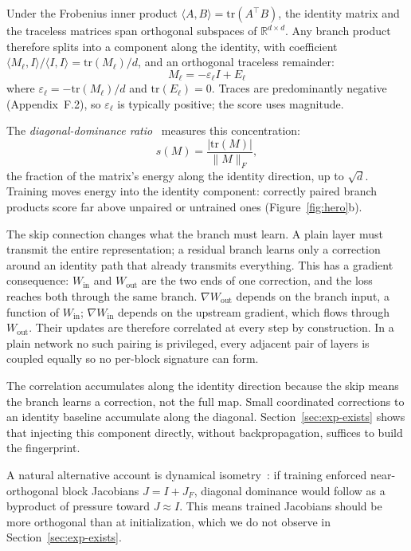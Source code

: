 \documentclass[letterpaper]{article}
\begin{document}
Under the Frobenius inner product $\langle A, B \rangle = \mathrm{tr}(A^\top B)$, the identity matrix and the traceless matrices span orthogonal subspaces of $\mathbb{R}^{d \times d}$. Any branch product therefore splits into a component along the identity, with coefficient $\langle M_\ell, I \rangle / \langle I, I \rangle = \mathrm{tr}(M_\ell)/d$, and an orthogonal traceless remainder:
\begin{equation}\label{eq:decomp}
M_\ell = -\varepsilon_\ell I + E_\ell
\end{equation}
where $\varepsilon_\ell = -\mathrm{tr}(M_\ell)/d$ and $\mathrm{tr}(E_\ell) = 0$.
Traces are predominantly negative (Appendix~F.2), so $\varepsilon_\ell$ is typically positive; the score uses magnitude.

The \emph{diagonal-dominance ratio}~\citep{park2026idroppedneuralnet} measures this concentration:
\begin{equation}\label{eq:dd-score}
s(M) = \frac{|\mathrm{tr}(M)|}{\|M\|_F},
\end{equation}
the fraction of the matrix's energy along the identity direction, up to $\sqrt{d}$. Training moves energy into the identity component: correctly paired branch products score far above unpaired or untrained ones (Figure~\ref{fig:hero}b).

The skip connection changes what the branch must learn. A plain layer must transmit the entire representation; a residual branch learns only a correction around an identity path that already transmits everything. This has a gradient consequence: $W_{\mathrm{in}}$ and $W_{\mathrm{out}}$ are the two ends of one correction, and the loss reaches both through the same branch. $\nabla W_{\mathrm{out}}$ depends on the branch input, a function of $W_{\mathrm{in}}$; $\nabla W_{\mathrm{in}}$ depends on the upstream gradient, which flows through $W_{\mathrm{out}}$. Their updates are therefore correlated at every step by construction. In a plain network no such pairing is privileged, every adjacent pair of layers is coupled equally so no per-block signature can form.

The correlation accumulates along the identity direction because the skip means the branch learns a correction, not the full map. Small coordinated corrections to an identity baseline accumulate along the diagonal. Section~\ref{sec:exp-exists} shows that injecting this component directly, without backpropagation, suffices to build the fingerprint.

A natural alternative account is dynamical isometry~\citep{pennington2017resurrecting}: if training enforced near-orthogonal block Jacobians $J = I + J_F$, diagonal dominance would follow as a byproduct of pressure toward $J \approx I$. This means trained Jacobians should be more orthogonal than at initialization, which we do not observe in Section~\ref{sec:exp-exists}.
\end{document}
